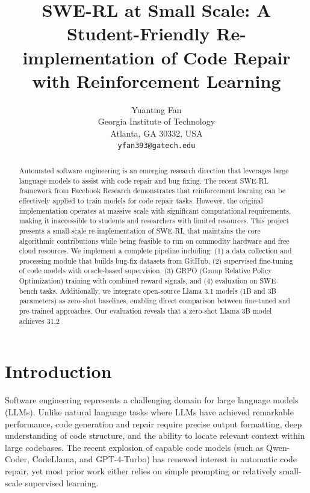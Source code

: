\documentclass{article} %
\title{SWE-RL at Small Scale: A Student-Friendly Re-implementation of Code Repair with Reinforcement Learning}
\author{Yuanting Fan \\
Georgia Institute of Technology \\
Atlanta, GA 30332, USA \\
\texttt{yfan393@gatech.edu}
}
\begin{document}
\maketitle

\begin{abstract}
Automated software engineering is an emerging research direction that leverages large language models to assist with code repair and bug fixing. The recent SWE-RL framework from Facebook Research demonstrates that reinforcement learning can be effectively applied to train models for code repair tasks. However, the original implementation operates at massive scale with significant computational requirements, making it inaccessible to students and researchers with limited resources. This project presents a small-scale re-implementation of SWE-RL that maintains the core algorithmic contributions while being feasible to run on commodity hardware and free cloud resources. We implement a complete pipeline including: (1) a data collection and processing module that builds bug-fix datasets from GitHub, (2) supervised fine-tuning of code models with oracle-based supervision, (3) GRPO (Group Relative Policy Optimization) training with combined reward signals, and (4) evaluation on SWE-bench tasks. Additionally, we integrate open-source Llama 3.1 models (1B and 3B parameters) as zero-shot baselines, enabling direct comparison between fine-tuned and pre-trained approaches. Our evaluation reveals that a zero-shot Llama 3B model achieves 31.2%
\end{abstract}

\section{Introduction}

Software engineering represents a challenging domain for large language models (LLMs). Unlike natural language tasks where LLMs have achieved remarkable performance, code generation and repair require precise output formatting, deep understanding of code structure, and the ability to locate relevant context within large codebases. The recent explosion of capable code models (such as Qwen-Coder, CodeLlama, and GPT-4-Turbo) has renewed interest in automatic code repair, yet most prior work either relies on simple prompting or relatively small-scale supervised learning.
\end{document}
